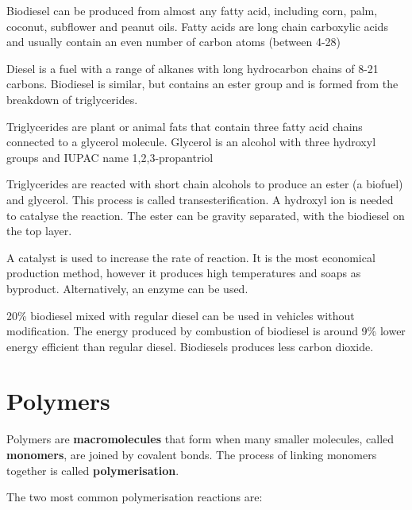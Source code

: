 			Biodiesel can be produced from almost any fatty acid, including corn, palm, coconut, subflower and peanut oils. Fatty acids are long chain carboxylic acids and usually contain an even number of carbon atoms (between 4-28)

			Diesel is a fuel with a range of alkanes with long hydrocarbon chains of 8-21 carbons. Biodiesel is similar, but contains an ester group and is formed from the breakdown of triglycerides.

			Triglycerides are plant or animal fats that contain three fatty acid chains connected to a glycerol molecule. Glycerol is an alcohol with three hydroxyl groups and IUPAC name 1,2,3-propantriol

			\begin{center}
			\end{center}

			\begin{center}
			\end{center}

			Triglycerides are reacted with short chain alcohols to produce an ester (a biofuel) and glycerol. This process is called transesterification. A hydroxyl ion is needed to catalyse the reaction. The ester can be gravity separated, with the biodiesel on the top layer.

			A catalyst is used to increase the rate of reaction. It is the most economical production method, however it produces high temperatures and soaps as byproduct. Alternatively, an enzyme can be used.

			20\% biodiesel mixed with regular diesel can be used in vehicles without modification. The energy produced by combustion of biodiesel is around 9\% lower energy efficient than regular diesel. Biodiesels produces less carbon dioxide.

\section{Polymers} \label{23/06/2025}

	Polymers are \textbf{macromolecules} that form when many smaller molecules, called \textbf{monomers}, are joined by covalent bonds. The process of linking monomers together is called \textbf{polymerisation}.

	The two most common polymerisation reactions are:

